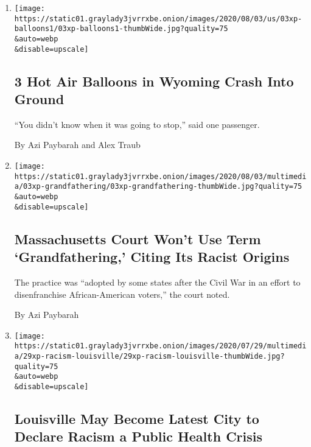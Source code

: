 \begin{enumerate}
\def\labelenumi{\arabic{enumi}.}
\item
  \href{/2020/08/04/us/wyoming-hot-air-balloons-crash.html}{}

  \texttt{[image: https://static01.graylady3jvrrxbe.onion/images/2020/08/03/us/03xp-balloons1/03xp-balloons1-thumbWide.jpg?quality=75\\\&auto=webp\\\&disable=upscale]}

  \hypertarget{3-hot-air-balloons-in-wyoming-crash-into-ground}{%
  \subsection{3 Hot Air Balloons in Wyoming Crash Into
  Ground}\label{3-hot-air-balloons-in-wyoming-crash-into-ground}}

  ``You didn't know when it was going to stop,'' said one passenger.

  By Azi Paybarah and Alex Traub
\item
  \href{/2020/08/03/us/racism-massachusetts-grandfathering.html}{}

  \texttt{[image: https://static01.graylady3jvrrxbe.onion/images/2020/08/03/multimedia/03xp-grandfathering/03xp-grandfathering-thumbWide.jpg?quality=75\\\&auto=webp\\\&disable=upscale]}

  \hypertarget{massachusetts-court-wont-use-term-grandfathering-citing-its-racist-origins}{%
  \subsection{Massachusetts Court Won't Use Term `Grandfathering,'
  Citing Its Racist
  Origins}\label{massachusetts-court-wont-use-term-grandfathering-citing-its-racist-origins}}

  The practice was ``adopted by some states after the Civil War in an
  effort to disenfranchise African-American voters,'' the court noted.

  By Azi Paybarah
\item
  \href{/2020/07/30/us/louisville-racism-crisis.html}{}

  \texttt{[image: https://static01.graylady3jvrrxbe.onion/images/2020/07/29/multimedia/29xp-racism-louisville/29xp-racism-louisville-thumbWide.jpg?quality=75\\\&auto=webp\\\&disable=upscale]}

  \hypertarget{louisville-may-become-latest-city-to-declare-racism-a-public-health-crisis}{%
  \subsection{Louisville May Become Latest City to Declare Racism a
  Public Health
  Crisis}\label{louisville-may-become-latest-city-to-declare-racism-a-public-health-crisis}}


\end{enumerate}
